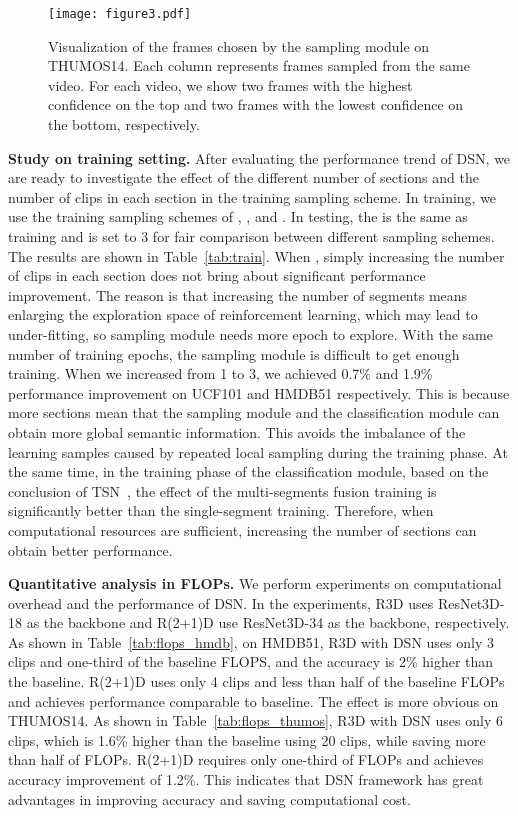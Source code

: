\documentclass[journal]{IEEEtran}
\begin{document}
\begin{figure*}[t]
  \centering
  \texttt{[image: figure3.pdf]}
  \caption{Visualization of the frames chosen by the sampling module on THUMOS14. Each column represents frames sampled from the same video. For each video, we show two frames with the highest confidence on the top and two frames with the lowest confidence on the bottom, respectively.}
  \label{fig:visualization}
  \vspace{-2mm}
\end{figure*}

\textbf{Study on training setting.}
After evaluating the performance trend of DSN, we are ready to investigate the effect of the different number of sections and the number of clips in each section in the training sampling scheme.
In training, we use the training sampling schemes of , , and . In testing, the  is the same as training and  is set to 3 for fair comparison between different sampling schemes.
The results are shown in Table~\ref{tab:train}.
When , simply increasing the number of clips in each section does not bring about significant performance improvement.
The reason is that increasing the number of segments means enlarging the exploration space of reinforcement learning, which may lead to under-fitting, so sampling module needs more epoch to explore.
With the same number of training epochs, the sampling module is difficult to get enough training.
When we increased  from 1 to 3, we achieved 0.7\% and 1.9\% performance improvement on UCF101 and HMDB51 respectively.
This is because more sections mean that the sampling module and the classification module can obtain more global semantic information.
This avoids the imbalance of the learning samples caused by repeated local sampling during the training phase.
At the same time, in the training phase of the classification module, based on the conclusion of TSN~\cite{TSN-J}, the effect of the multi-segments fusion training is significantly better than the single-segment training.
Therefore, when computational resources are sufficient, increasing the number of sections can obtain better performance.


\textbf{Quantitative analysis in FLOPs.}
We perform experiments on computational overhead and the performance of DSN.
In the experiments, R3D uses ResNet3D-18 as the backbone and R(2+1)D use ResNet3D-34 as the backbone, respectively.
As shown in Table~\ref{tab:flops_hmdb}, on HMDB51, R3D with DSN uses only 3 clips and one-third of the baseline FLOPS, and the accuracy is 2\% higher than the baseline.
R(2+1)D uses only 4 clips and less than half of the baseline FLOPs and achieves performance comparable to baseline.
The effect is more obvious on THUMOS14.
As shown in Table~\ref{tab:flops_thumos}, R3D with DSN uses only 6 clips, which is 1.6\% higher than the baseline using 20 clips, while saving more than half of FLOPs.
R(2+1)D requires only one-third of FLOPs and achieves accuracy improvement of 1.2\%.
This indicates that DSN framework has great advantages in improving accuracy and saving computational cost.
\end{document}
